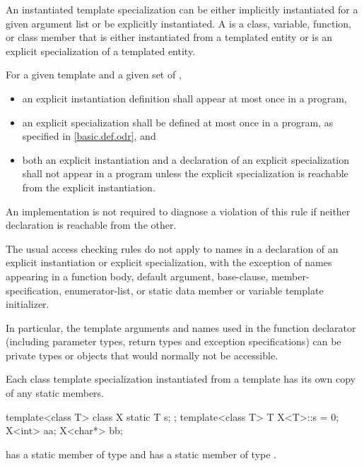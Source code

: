 \pnum
An instantiated template specialization can be either implicitly
instantiated for a given argument list or be explicitly
instantiated.
A  is a class, variable, function, or class member that is either
instantiated from a templated entity or is an
explicit specialization of a templated entity.

\pnum
For a given template and a given set of
,
\begin{itemize}
\item
an explicit instantiation definition shall appear at most once in a program,
\item
an explicit specialization shall be defined at most once
in a program, as specified in \ref{basic.def.odr}, and
\item
both an explicit instantiation and a declaration of an
explicit specialization shall not appear in a program unless
the explicit specialization is reachable from the explicit instantiation.
\end{itemize}
An implementation is not required to diagnose a violation of this rule
if neither declaration is reachable from the other.

\pnum
The usual access checking rules do not apply to names
in a declaration of an explicit instantiation or explicit specialization,
with the exception of names appearing in a function body,
default argument, base-clause, member-specification, enumerator-list,
or static data member or variable template initializer.
\begin{note}
In particular, the template arguments and names
used in the function declarator
(including parameter types, return types and exception specifications)
can be private types or objects that would normally not be accessible.
\end{note}

\pnum
Each class template specialization instantiated from a template has its own
copy of any static members.
\begin{example}
\begin{codeblock}
template<class T> class X {
  static T s;
};
template<class T> T X<T>::s = 0;
X<int> aa;
X<char*> bb;
\end{codeblock}

has a static member
of type
and
has a static member
of type
.
\end{example}

